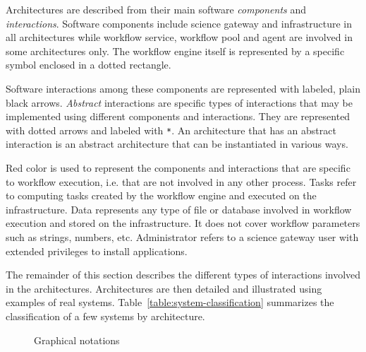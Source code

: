 \documentclass[preprint,3p,twocolumn]{elsarticle}
\begin{document}
Architectures are described from their main software \emph{components}
and \emph{interactions}. Software components include science gateway
and infrastructure in all architectures while workflow service,
workflow pool and agent are involved in some architectures only. The
workflow engine itself is represented by a specific symbol enclosed in a dotted rectangle.

Software interactions among these components are represented with
labeled, plain black arrows.  \emph{Abstract} interactions are
specific types of interactions that may be implemented using different
components and interactions. They are represented with dotted arrows
and labeled with \texttt{*}. An architecture that has an abstract
interaction is an abstract architecture that can be instantiated in
various ways.

Red color is used to represent the components and interactions that
are specific to workflow execution, i.e. that are not involved in any
other process. Tasks refer to computing tasks created by the workflow
engine and executed on the infrastructure. Data represents any type of
file or database involved in workflow execution and stored on the
infrastructure. It does not cover workflow parameters such as strings,
numbers, etc. Administrator refers to a science gateway user with
extended privileges to install applications.

The remainder of this section describes the different types of
interactions involved in the architectures. Architectures are then
detailed and illustrated using examples of real
systems. Table~\ref{table:system-classification} summarizes the
classification of a few systems by architecture.


\begin{figure}
\centering
\def\svgwidth{0.7\columnwidth}

\caption{Graphical notations}
\label{fig:notations}
\end{figure}
\end{document}
